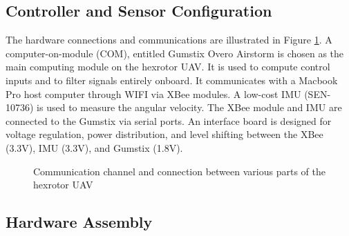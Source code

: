 \documentclass[twocolumn,letterpaper]{IEEEAerospaceCLS}  %
\begin{document}


\subsection{Controller and Sensor Configuration}


The hardware connections and communications are illustrated in Figure \ref{HardwareSchematic}. A computer-on-module (COM), entitled Gumstix Overo Airstorm is chosen as the main computing module on the hexrotor UAV. It is used to compute control inputs and to filter signals entirely onboard. It communicates with a Macbook Pro host computer through WIFI via XBee modules. A low-cost IMU (SEN-10736) is used to measure the angular velocity. The XBee module and IMU are connected to the Gumstix via serial ports. An interface board is designed for voltage regulation, power distribution, and level shifting between the XBee (3.3V), IMU (3.3V), and Gumstix (1.8V). 

\begin{figure}
\centerline{
	}
\caption{Communication channel and connection between various parts of the hexrotor UAV}
\label{HardwareSchematic}
\end{figure}


	


\subsection{Hardware Assembly}

\end{document}
